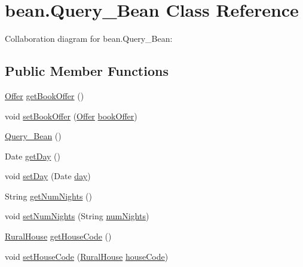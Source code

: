 \hypertarget{classbean_1_1Query__Bean}{}\section{bean.\+Query\+\_\+\+Bean Class Reference}
\label{classbean_1_1Query__Bean}


Collaboration diagram for bean.\+Query\+\_\+\+Bean\+:
\subsection*{Public Member Functions}
\begin{DoxyCompactItemize}
\item 
\mbox{\hyperlink{classdomain_1_1Offer}{Offer}} \mbox{\hyperlink{classbean_1_1Query__Bean_a24e8cd9b440666b540a2272d5df12e24}{get\+Book\+Offer}} ()
\item 
void \mbox{\hyperlink{classbean_1_1Query__Bean_a1d4d548f29f696871171ff5d7eca964a}{set\+Book\+Offer}} (\mbox{\hyperlink{classdomain_1_1Offer}{Offer}} \mbox{\hyperlink{classbean_1_1Query__Bean_ab3019b29aceba9be1d718c06f02efbf0}{book\+Offer}})
\item 
\mbox{\hyperlink{classbean_1_1Query__Bean_a47c80baa63310192373c60c0f09116bb}{Query\+\_\+\+Bean}} ()
\item 
Date \mbox{\hyperlink{classbean_1_1Query__Bean_a34d5b9a6d575a9270079c5376822bd00}{get\+Day}} ()
\item 
void \mbox{\hyperlink{classbean_1_1Query__Bean_ab1e76631718151a10efad6a17c43cb5d}{set\+Day}} (Date \mbox{\hyperlink{classbean_1_1Query__Bean_a84d256eca7a4f868d77e549b82d87ddf}{day}})
\item 
String \mbox{\hyperlink{classbean_1_1Query__Bean_ab979d29b59d31df3848b6a2420cbbc70}{get\+Num\+Nights}} ()
\item 
void \mbox{\hyperlink{classbean_1_1Query__Bean_a0d747c549bd5fb3981c5176b3532fdeb}{set\+Num\+Nights}} (String \mbox{\hyperlink{classbean_1_1Query__Bean_a76fd38e1297497efc591fc46a6ae64f4}{num\+Nights}})
\item 
\mbox{\hyperlink{classdomain_1_1RuralHouse}{Rural\+House}} \mbox{\hyperlink{classbean_1_1Query__Bean_a82506db8f6c6211fb6ad55310c63d0b6}{get\+House\+Code}} ()
\item 
void \mbox{\hyperlink{classbean_1_1Query__Bean_a69e1bb757c523c799cd3db72d7299fe1}{set\+House\+Code}} (\mbox{\hyperlink{classdomain_1_1RuralHouse}{Rural\+House}} \mbox{\hyperlink{classbean_1_1Query__Bean_af1040de2275895452b9e60535b4983b6}{house\+Code}})

\end{DoxyCompactItemize}
